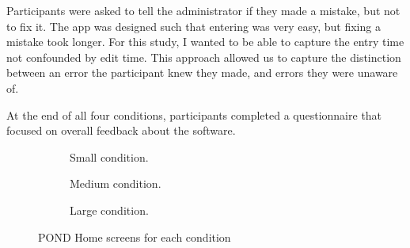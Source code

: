 Participants were asked to tell the administrator if they made a mistake, but not to fix it. The app was designed such that entering was very easy, but fixing a mistake took longer. For this study, I wanted to be able to capture the entry time not confounded by edit time. This approach allowed us to capture the distinction between an error the participant knew they made, and errors they were unaware of. 

At the end of all four conditions, participants completed a questionnaire that focused on overall feedback about the software. 
\begin{figure}	
\centering
	\begin{subfigure}[t]{1.25in}
		\centering
		\setlength\fboxsep{0pt}
\setlength\fboxrule{0.5pt}
		\caption{Small condition.}\label{fig:small_cond}
	\end{subfigure}
\quad
\begin{subfigure}[t]{1.25in}
		\centering
		\setlength\fboxsep{0pt}
\setlength\fboxrule{0.5pt}
		\caption{Medium condition. }\label{fig:med_cond}
	\end{subfigure}
\quad
\begin{subfigure}[t]{1.25in}
		\centering
		\setlength\fboxsep{0pt}
\setlength\fboxrule{0.5pt}
		\caption{Large condition. }\label{fig:large_cond}
	\end{subfigure}
	\caption{POND Home screens for each condition}\label{fig:3_1}
\end{figure}



